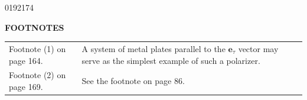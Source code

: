 \begin{scanpage}{0192}{174}
\begin{center}\textbf{FOOTNOTES}\end{center}
\begin{tabular}{p{.44\linewidth}p{.50\linewidth}}
Footnote (1) on page 164.&A system of metal plates parallel to the $\mathbf e_\tau$ vector may serve as the simplest example of such a polarizer.\\[1em]
Footnote (2) on page 169.&See the footnote on page 86.
\end{tabular}
\end{scanpage}
